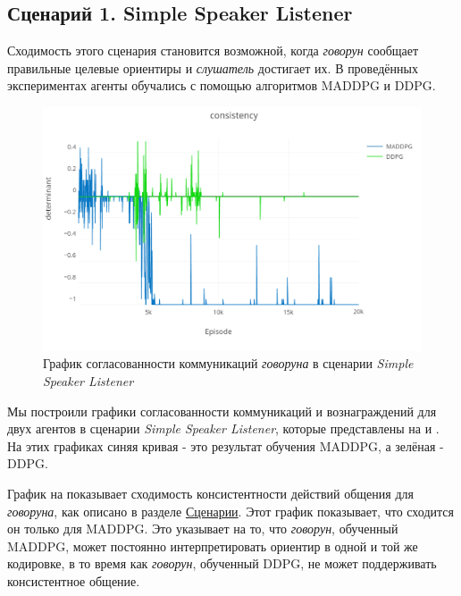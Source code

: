 \subsection{Сценарий 1. Simple Speaker Listener}

Сходимость этого сценария становится возможной, когда \textit{говорун} сообщает правильные целевые ориентиры и \textit{слушатель} достигает их. В проведённых экспериментах агенты обучались с помощью алгоритмов MADDPG и DDPG.

\begin{figure}[ht!]
    \center
    \includegraphics [scale=0.38] {my_folder/images/ch5/ssl-comm.png}
    \caption{График согласованности коммуникаций \textit{говоруна} в сценарии \textit{Simple Speaker Listener}}
    \label{fig:result-ssl-comm}
\end{figure}

Мы построили графики согласованности коммуникаций и вознаграждений для двух агентов в сценарии \textit{Simple Speaker Listener}, которые представлены на  и . На этих графиках синяя кривая - это результат обучения MADDPG, а зелёная - DDPG.

График на  показывает сходимость консистентности действий общения для \textit{говоруна}, как описано в разделе \hyperref[exp-ssl]{Сценарии}. Этот график показывает, что сходится он только для MADDPG. Это указывает на то, что \textit{говорун}, обученный MADDPG, может постоянно интерпретировать ориентир в одной и той же кодировке, в то время как \textit{говорун}, обученный DDPG, не может поддерживать консистентное общение.

